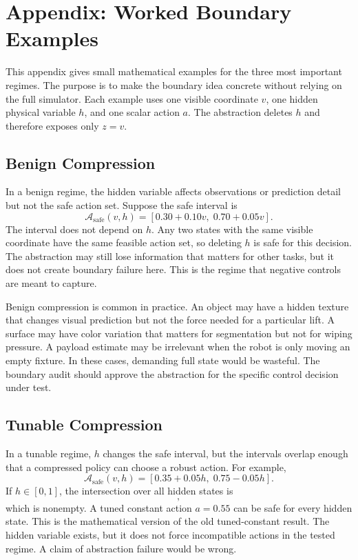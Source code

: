 \documentclass{article}
\begin{document}
\clearpage
\section{Appendix: Worked Boundary Examples}

This appendix gives small mathematical examples for the three most important
regimes. The purpose is to make the boundary idea concrete without relying on
the full simulator. Each example uses one visible coordinate $v$, one hidden
physical variable $h$, and one scalar action $a$. The abstraction deletes $h$ and
therefore exposes only $z=v$.

\subsection{Benign Compression}

In a benign regime, the hidden variable affects observations or prediction
detail but not the safe action set. Suppose the safe interval is
\begin{equation}
    \mathcal{A}_{\mathrm{safe}}(v,h) =
    [0.30 + 0.10v,\; 0.70 + 0.05v].
\end{equation}
The interval does not depend on $h$. Any two states with the same visible
coordinate have the same feasible action set, so deleting $h$ is safe for this
decision. The abstraction may still lose information that matters for other
tasks, but it does not create boundary failure here. This is the regime that
negative controls are meant to capture.

Benign compression is common in practice. An object may have a hidden texture
that changes visual prediction but not the force needed for a particular lift. A
surface may have color variation that matters for segmentation but not for
wiping pressure. A payload estimate may be irrelevant when the robot is only
moving an empty fixture. In these cases, demanding full state would be wasteful.
The boundary audit should approve the abstraction for the specific control
decision under test.

\subsection{Tunable Compression}

In a tunable regime, $h$ changes the safe interval, but the intervals overlap
enough that a compressed policy can choose a robust action. For example,
\begin{equation}
    \mathcal{A}_{\mathrm{safe}}(v,h) =
    [0.35 + 0.05h,\; 0.75 - 0.05h].
\end{equation}
If $h \in [0,1]$, the intersection over all hidden states is
\begin{equation}
    [0.40,\;0.70],
\end{equation}
which is nonempty. A tuned constant action $a=0.55$ can be safe for every hidden
state. This is the mathematical version of the old tuned-constant result. The
hidden variable exists, but it does not force incompatible actions in the tested
regime. A claim of abstraction failure would be wrong.
\end{document}
